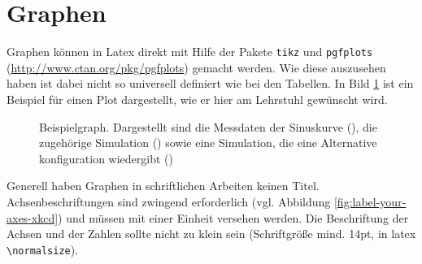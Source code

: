 \section{Graphen}

Graphen können in Latex direkt mit Hilfe der Pakete \verb+tikz+ und \verb+pgfplots+ (\url{http://www.ctan.org/pkg/pgfplots}) gemacht werden. Wie diese auszusehen haben ist dabei nicht so universell definiert wie bei den Tabellen. In Bild \ref{fig:example-graph} ist ein Beispiel für einen Plot dargestellt, wie er hier am Lehrstuhl gewünscht wird.

\begin{figure}[H]%
    \centering
    \tikzset{external/export next=false}
    
    
    
    \caption{Beispielgraph. Dargestellt sind die Messdaten der Sinuskurve (\protect{}), die zugehörige Simulation (\protect{}) sowie eine Simulation, die eine Alternative konfiguration wiedergibt (\protect{})}%
    \label{fig:example-graph}%
\end{figure}

Generell haben Graphen in schriftlichen Arbeiten keinen Titel. Achsenbeschriftungen sind zwingend erforderlich (vgl. Abbildung \ref{fig:label-your-axes-xkcd}) und müssen mit einer Einheit versehen werden. Die Beschriftung der Achsen und der Zahlen sollte nicht zu klein sein (Schriftgröße mind. 14pt, in latex \verb+\normalsize+).

